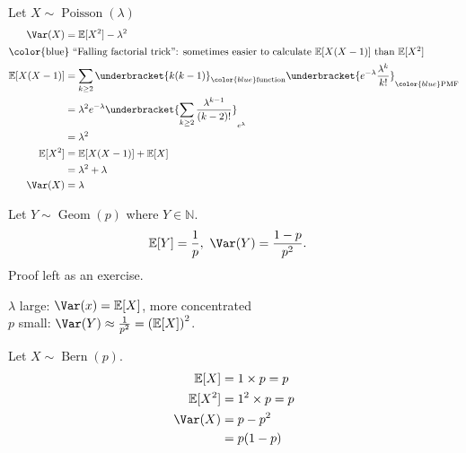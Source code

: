 \begin{example}
    Let $X \sim \operatorname{Poisson}(\lambda)$
    \begin{align*}
        \Var(X) &= \mathbb{E}[X^2] - \lambda^2 \\
        \intertext{\color{blue} ``Falling factorial trick'': sometimes easier to calculate $\mathbb{E}[X (X - 1)]$ than $\mathbb{E}[X^2]$}
        \mathbb{E}[X(X-1)] &= \sum_{k \geq 2} \underbracket{k(k-1)}_{\color{blue} \text{function}} \underbracket{e^{- \lambda} \frac{\lambda^k}{k!}}_{\color{blue} \text{PMF}} \\
        &= \lambda^2 e^{- \lambda} \underbracket{\sum_{k \geq 2} \frac{\lambda^{k - 1}}{(k - 2)!}}_{e^\lambda} \\
        &= \lambda^2 \\
        \mathbb{E}[X^2] &= \mathbb{E}[X (X - 1)] + \mathbb{E}[X] \\
        &= \lambda^2 + \lambda \\
        \Var(X) &= \lambda
    \end{align*} 
\end{example} 

\begin{example}
    Let $Y \sim \operatorname{Geom}(p)$ where $Y \in \mathbb{N}$.
    \begin{align*}
        \mathbb{E}[Y] &= \frac{1}{p},\ \Var(Y) = \frac{1 - p}{p^2}.
    \end{align*} 
    Proof left as an exercise.
\end{example} 

\color{blue}
\begin{note}
    $\lambda$ large: $\Var(x) = \mathbb{E}[X]$, \color{red}more concentrated \color{blue} \\
    $p$ small: $\Var(Y) \approx \frac{1}{p^2} = \left( \mathbb{E}[X] \right)^2$.
\end{note} 

\begin{example}
    Let $X \sim \operatorname{Bern}(p)$.
    \begin{align*}
        \mathbb{E}[X] &= 1 \times p = p \\
        \mathbb{E}[X^2] &= 1^2 \times p = p \\
        \Var(X) &= p - p^2 \\
        &= p(1-p)
    \end{align*} 
\end{example} 

